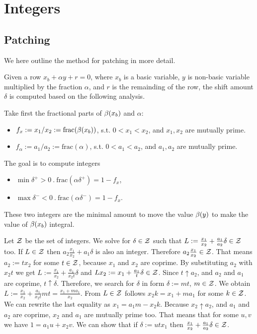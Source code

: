 \section{Integers}
\label{app:ip}

\subsection{Patching}
\label{app:ip-patching}

We here outline the method for patching in more detail.

Given a row $x_b + \alpha y + r = 0$, where
$x_b$ is a basic variable, $y$ is non-basic variable multiplied by the fraction $\alpha$,
and $r$ is the remainding of the row, the shift amount $\delta$ is computed based on the
following analysis.

Take first the fractional parts of $\beta(x_b)$ and $\alpha$:

\begin{itemize}
\item $f_x := x_1/x_2 := \mathrm{frac}(\beta(x_b))$, s.t. $0 < x_1 < x_2$, and $x_1, x_2$ are mutually prime.
\item $f_\alpha := a_1/a_2 := \mathrm{frac}(\alpha)$, s.t. $0 < a_1 < a_2$, and $ a_1, a_2 $ are mutually prime.
\end{itemize}

The goal is to compute integers

\begin{itemize}
\item $\min \delta^+ > 0 \ . \ \mathrm{frac}(\alpha\delta^+) = 1 - f_x$,
\item $\max \delta^- < 0 \ . \ \mathrm{frac}(\alpha\delta^-) = 1 - f_x$.
\end{itemize}
These two integers are the minimal amount to move the value $\beta(y)$ to make the value of $\beta(x_b)$ integral.

Let $\mathcal{Z}$ be the set of integers.
We solve for $\delta \in \mathcal{Z}$ such that $L := \frac{x_1}{x_2}+\frac{a_1}{a_2}\delta \in \mathcal{Z}$ too. 
If $L \in \mathcal{Z}$ then $a_2 \frac{x_1}{x_2}+ a_1\delta$ is also an integer. Therefore $a_2 \frac{x_1}{x_2} \in \mathcal{Z}$. 
That means $a_2 := t x_2$ for some $t \in \mathcal{Z}$, because $x_1$ and $x_2$ are coprime. 
By substituting $a_2$ with $x_2 t$ we get $L:= \frac{x_1}{x_2}+\frac{a_1}{x_2 t}\delta$ and $L x_2 := x_1+\frac{a_1}{t}\delta \in \mathcal{Z}$.
Since $t \uparrow a_2$, and $a_2$ and $a_1$ are coprime, $t \uparrow \delta$. Therefore, we search for $\delta$ in form $\delta :=m t$, $m \in \mathcal{Z}$.
 We obtain $L:=  \frac{x_1}{x_2}+\frac{a_1}{x_2 t} m t = \frac{x_1+m a_1}{x_2}$. 
 From $L \in \mathcal{Z}$ follows $x_2 k = x_1 + m a_1$ for some $k \in \mathcal{Z}$. We can rewrite the 
 last equality as $x_1 =  a_1 m - x_2 k$. Because $x_2 \uparrow a_2$, and $a_1$ and $a_2$ are coprime, $x_2$ and $a_1$ are mutually prime too. That means that for some $u, v$ we have 
 $1 = a_1 u + x_2 v$. We can show that if $\delta := u t x_1$ then $\frac{x_1}{x_2}+\frac{a_1}{a_2}\delta \in \mathcal{Z}$. 
 

